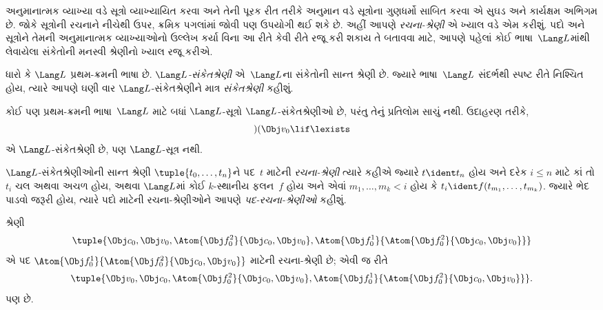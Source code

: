 અનુમાનાત્મક વ્યાખ્યા વડે સૂત્રો વ્યાખ્યાયિત કરવા અને તેની
પૂરક રીત તરીકે અનુમાન વડે સૂત્રોના ગુણધર્મો સાબિત કરવા એ
સુઘડ અને કાર્યક્ષમ અભિગમ છે. જોકે સૂત્રોની રચનાને નીચેથી ઉપર,
ક્રમિક પગલાંમાં જોવી પણ ઉપયોગી થઈ શકે છે. અહીં આપણે \emph{રચના-શ્રેણી}
એ ખ્યાલ વડે એમ કરીશું.
પદો અને સૂત્રોને તેમની અનુમાનાત્મક વ્યાખ્યાઓનો ઉલ્લેખ કર્યા વિના
આ રીતે કેવી રીતે રજૂ કરી શકાય તે બતાવવા માટે, આપણે પહેલાં કોઈ
ભાષા~$\Lang L$માંથી લેવાયેલા સંકેતોની મનસ્વી શ્રેણીનો ખ્યાલ રજૂ કરીએ.

\begin{defn}[સંકેતશ્રેણીઓ]
ધારો કે $\Lang L$ પ્રથમ-ક્રમની ભાષા છે. \emph{$\Lang L$-સંકેતશ્રેણી}
એ~$\Lang L$ના સંકેતોની સાન્ત શ્રેણી છે. જ્યારે ભાષા~$\Lang L$ સંદર્ભથી
સ્પષ્ટ રીતે નિશ્ચિત હોય, ત્યારે આપણે ઘણી વાર $\Lang L$-સંકેતશ્રેણીને
માત્ર \emph{સંકેતશ્રેણી} કહીશું.
\end{defn}

\begin{ex}
કોઈ પણ પ્રથમ-ક્રમની ભાષા~$\Lang L$ માટે બધાં $\Lang L$-સૂત્રો
$\Lang L$-સંકેતશ્રેણીઓ છે, પરંતુ તેનું પ્રતિલોમ સાચું નથી. ઉદાહરણ તરીકે,
\[)(\Obj v_0\lif\lexists\]
એ $\Lang L$-સંકેતશ્રેણી છે, પણ $\Lang L$-સૂત્ર નથી.
\end{ex}

\begin{defn}[પદો માટેની રચના-શ્રેણીઓ]
$\Lang L$-સંકેતશ્રેણીઓની સાન્ત શ્રેણી $\tuple{t_0,\dotsc,t_n}$ને પદ~$t$
માટેની \emph{રચના-શ્રેણી} ત્યારે કહીએ જ્યારે $t \ident t_n$ હોય અને
દરેક $i \leq n$ માટે કાં તો $t_i$ ચલ અથવા અચળ હોય,
અથવા $\Lang L$માં કોઈ $k$-સ્થાનીય ફલન~$f$ હોય અને એવાં
$m_1,\dotsc,m_k < i$ હોય કે
$t_i \ident f(t_{m_1},\dotsc,t_{m_k})$. જ્યારે ભેદ પાડવો જરૂરી હોય,
ત્યારે પદો માટેની રચના-શ્રેણીઓને આપણે \emph{પદ-રચના-શ્રેણીઓ} કહીશું.
\end{defn}

\begin{ex}
શ્રેણી
\[
    \tuple{\Obj c_0, \Obj v_0, \Atom{\Obj f^2_0}{\Obj c_0, \Obj v_0}, \Atom{\Obj f^1_0}{\Atom{\Obj f^2_0}{\Obj c_0, \Obj v_0}}}
\]
એ પદ $\Atom{\Obj f^1_0}{\Atom{\Obj f^2_0}{\Obj c_0, \Obj v_0}}$
માટેની રચના-શ્રેણી છે; એવી જ રીતે
\[
    \tuple{\Obj v_0, \Obj c_0, \Atom{\Obj f^2_0}{\Obj c_0, \Obj v_0}, \Atom{\Obj f^1_0}{\Atom{\Obj f^2_0}{\Obj c_0, \Obj v_0}}}.
\]
પણ છે.
\end{ex}

